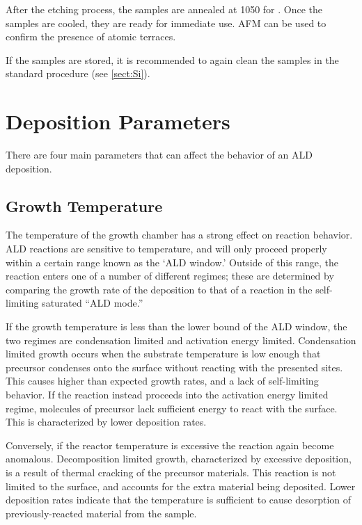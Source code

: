 After the etching process, the samples are annealed at 1050\degC{} for . Once the samples are cooled, they are ready for immediate use. AFM can be used to confirm the presence of atomic terraces. 

If the samples are stored, it is recommended to again clean the samples in the standard procedure (see \ref{sect:Si}).


\section{Deposition Parameters}

There are four main parameters that can affect the behavior of an ALD deposition. 


\subsection{Growth Temperature}

The temperature of the growth chamber has a strong effect on reaction behavior. ALD reactions are sensitive to temperature, and will only proceed properly within a certain range known as the `ALD window.' Outside of this range, the reaction enters one of a number of different regimes; these are determined by comparing the growth rate of the deposition to that of a reaction in the self-limiting saturated ``ALD mode.'' 

If the growth temperature is less than the lower bound of the ALD window, the two regimes are condensation limited and activation energy limited. Condensation limited growth occurs when the substrate temperature is low enough that precursor condenses onto the surface without reacting with the presented sites. This causes higher than expected growth rates, and a lack of self-limiting behavior. If the reaction instead proceeds into the activation energy limited regime, molecules of precursor lack sufficient energy to react with the surface. This is characterized by lower deposition rates. 

Conversely, if the reactor temperature is excessive the reaction again become anomalous. Decomposition limited growth, characterized by excessive deposition, is a result of thermal cracking of the precursor materials. This reaction is not limited to the surface, and accounts for the extra material being deposited. Lower deposition rates indicate that the temperature is sufficient to cause desorption of previously-reacted material from the sample. 

